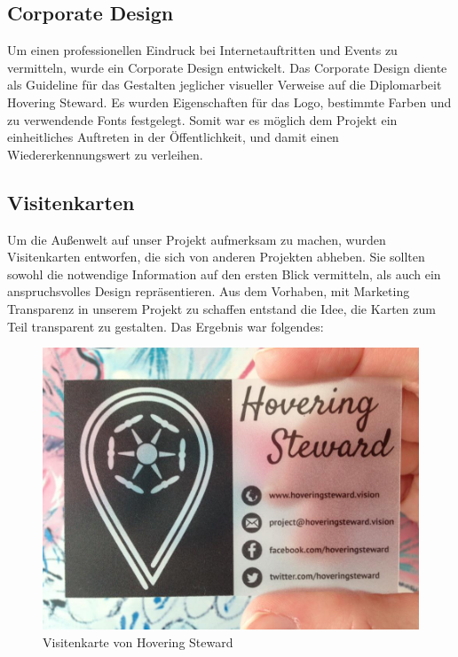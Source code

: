     \subsection*{Corporate Design}
    Um einen professionellen Eindruck bei Internetauftritten und Events zu vermitteln, wurde ein Corporate Design entwickelt.
    Das Corporate Design diente als Guideline für das Gestalten jeglicher visueller Verweise auf die Diplomarbeit Hovering Steward.
    Es wurden Eigenschaften für das Logo, bestimmte Farben und zu verwendende Fonts festgelegt.
    Somit war es möglich dem Projekt ein einheitliches Auftreten in der Öffentlichkeit, und damit einen Wiedererkennungswert zu verleihen.

    \subsection*{Visitenkarten}
    Um die Außenwelt auf unser Projekt aufmerksam zu machen, wurden Visitenkarten entworfen, die sich von anderen Projekten abheben.
    Sie sollten sowohl die notwendige Information auf den ersten Blick vermitteln, als auch ein anspruchsvolles Design repräsentieren. Aus dem Vorhaben,
    mit Marketing Transparenz in unserem Projekt zu schaffen entstand die Idee, die Karten zum Teil transparent zu gestalten.
    Das Ergebnis war folgendes:

    \begin{figure}[H]
      \begin{centering}
      \includegraphics[width = 1\textwidth]{Bilder/visitenkarte.jpg}
      \par\end{centering}
      \caption{Visitenkarte von Hovering Steward}
      \label{visitenkarte}
    \end{figure}

